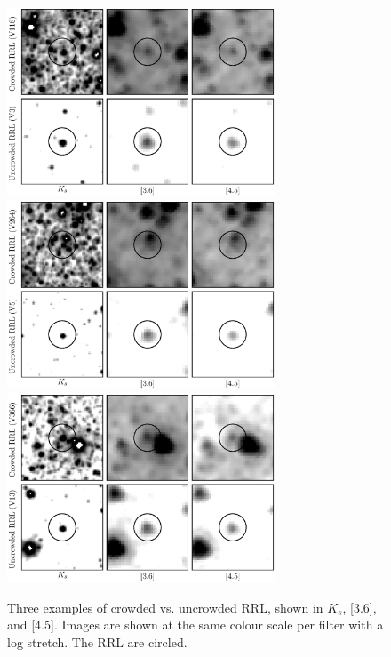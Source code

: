 \documentclass[a4paper,fleqn,usenatbib]{mnras}
\begin{document}
\begin{figure}
\begin{center}
\includegraphics[width=80mm]{../ocen_only_fitting/final_plots/crowding_example_3_118.eps}
\includegraphics[width=80mm]{../ocen_only_fitting/final_plots/crowding_example_5_264.eps}
\includegraphics[width=80mm]{../ocen_only_fitting/final_plots/crowding_example_13_366.eps}
\caption{Three examples of crowded vs. uncrowded RRL, shown in $K_s$, [3.6], and [4.5]. Images are shown at the same colour scale per filter with a log stretch. The RRL are circled.} 
\label{fig:crowding}
\end{center}
\end{figure}

\end{document}
